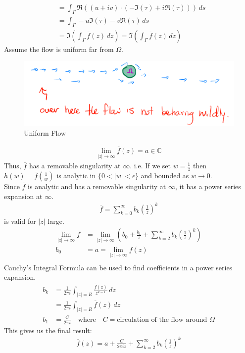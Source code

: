 \begin{example}
\begin{align*}
          & = \int_{\Gamma} \Re((u + iv) \cdot (-\Im(\tau) + i\Re(\tau))) \, ds                   \\
          & = \int_{\Gamma} -u\Im(\tau) - v\Re(\tau) \, ds                                        \\
          & = \Im(\int_{\Gamma} \overline{f}(z) \, dz) = \Im(\int_{\Gamma} \overline{f}(z) \, dz)
    \end{align*}
    Assume the flow is uniform far from $\Omega$.
    \begin{figure}[H]
        \centering
        \includegraphics[width=\textwidth]{LECTURE_19/uniform.png}
        \caption{Uniform Flow}

    \end{figure}
    \begin{align*}
        \lim_{|z| \to \infty} \overline{f}(z) = a \in \mathbb{C}
    \end{align*}
    Thus, $\overline{f}$ has a removable singularity at $\infty$.
    i.e. If we set $w = \frac{1}z$ then $h(w) = \overline{f}(\frac{1}w)$ is analytic in $\{0 < |w| < \epsilon\}$ and bounded as $w \to 0$.\\
    Since $\overline{f}$ is analytic and has a removable singularity at $\infty$, it has a power series expansion at $\infty$.
    \begin{align*}
        \overline{f} = \sum_{k = 0}^{\infty}b_k(\frac{1}z)^k
    \end{align*}
    is valid for $|z|$ large.
    \begin{align*}
        \lim_{|z| \to \infty} \overline{f} & = \lim_{|z| \to \infty} \left(b_0 + \frac{b_1}z + \sum_{k = 2}^{\infty}b_k(\frac{1}z)^k\right) \\
        b_0                                & = a = \lim_{|z| \to \infty} f(z)                                                               \\
    \end{align*}
    Cauchy's Integral Formula can be used to find coefficients in a power series expansion.
    \begin{align*}
        b_k & = \frac{1}{2\pi i}\int_{|z| = R} \frac{\overline{f}(z)}{z^{k-1}} \, dz                         \\
            & = \frac{1}{2\pi i}\int_{|z| = R} \overline{f}(z) \, dz                                         \\
        b_1 & = \frac{C}{2\pi i} \quad \text{where} \quad C = \text{circulation of the flow around $\Omega$}
    \end{align*}
    This gives us the final result:
    \begin{align*}
        \overline{f}(z) = a + \frac{C}{2\pi i z} + \sum_{k = 2}^{\infty}b_k(\frac{1}z)^k
    \end{align*}


\end{example}
